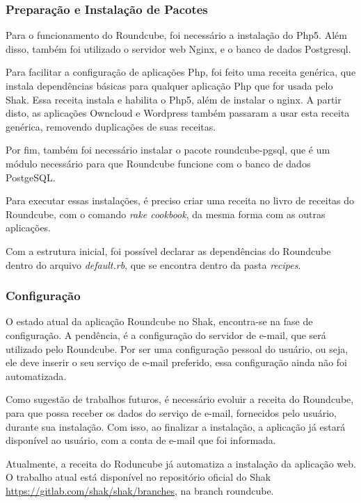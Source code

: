 \subsubsection{Preparação e Instalação de Pacotes}

Para o funcionamento do Roundcube, foi necessário a instalação do Php5. Além
disso, também foi utilizado o servidor web Nginx, e o 
banco de dados Postgresql.

Para facilitar a configuração de aplicações Php, foi feito uma receita genérica,
que instala dependências básicas para qualquer aplicação Php que for usada pelo
Shak. Essa receita instala e habilita o Php5, além de instalar o nginx. A partir
disto, as aplicações Owncloud e Wordpress também passaram a usar esta receita
genérica, removendo duplicações de suas receitas.

Por fim, também foi necessário instalar o pacote roundcube-pgsql, que é um módulo 
necessário para que Roundcube funcione com o banco de dados PostgeSQL.
 
Para executar essas instalações, é preciso criar uma receita no livro de receitas
do Roundcube, com o comando \textit{rake cookbook}, da mesma forma com as outras aplicações.
 
Com a estrutura inicial, foi possível declarar as dependências do Roundcube
dentro do arquivo \textit{default.rb}, que se encontra dentro da pasta 
\textit{recipes}. 

\subsubsection{Configuração}

O estado atual da aplicação Roundcube no Shak, encontra-se na fase de configuração. A pendência,
é a configuração do servidor de e-mail, que será utilizado pelo Roundcube. Por ser
uma configuração pessoal do usuário, ou seja, ele deve inserir o seu serviço
de e-mail preferido, essa configuração ainda não foi automatizada. 

Como sugestão de trabalhos futuros, é necessário evoluir a receita do Roundcube, 
para que possa receber os dados do serviço de e-mail, fornecidos pelo usuário, 
durante sua instalação. Com isso, ao finalizar a instalação, a aplicação já 
estará disponível ao usuário, com a conta de e-mail que foi informada.

Atualmente, a receita do Roduncube já automatiza a instalação da aplicação web. 
O trabalho atual está disponível no repositório oficial do Shak \url{https://gitlab.com/shak/shak/branches}, na branch roundcube.

